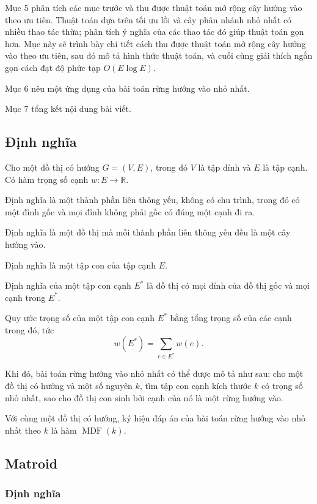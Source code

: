 \documentclass[11pt]{article}
\begin{document}
Mục 5 phân tích các mục trước và thu được thuật toán mở rộng cây hướng vào theo
ưu tiên. Thuật toán dựa trên tối ưu lồi và cây phân nhánh nhỏ nhất có nhiều thao
tác thừa; phân tích ý nghĩa của các thao tác đó giúp thuật toán gọn hơn. Mục
này sẽ trình bày chi tiết cách thu được thuật toán mở rộng cây hướng vào theo
ưu tiên, sau đó mô tả hình thức thuật toán, và cuối cùng giải thích ngắn gọn
cách đạt độ phức tạp \(O(E\log E)\).

Mục 6 nêu một ứng dụng của bài toán rừng hướng vào nhỏ nhất.

Mục 7 tổng kết nội dung bài viết.

\subsection{Định nghĩa}

Cho một đồ thị có hướng \(G=(V,E)\), trong đó \(V\) là tập đỉnh và \(E\) là tập
cạnh. Có hàm trọng số cạnh \(w:E\to\mathbb{R}\).

Định nghĩa  là một thành phần liên thông yếu, không có chu
trình, trong đó có một đỉnh gốc và mọi đỉnh không phải gốc có đúng một cạnh đi
ra.

Định nghĩa  là một đồ thị mà mỗi thành phần liên thông yếu
đều là một cây hướng vào.

Định nghĩa  là một tập con của tập cạnh \(E\).

Định nghĩa  của một tập con cạnh \(E^*\) là đồ
thị có mọi đỉnh của đồ thị gốc và mọi cạnh trong \(E^*\).

Quy ước trọng số của một tập con cạnh \(E^*\) bằng tổng trọng số của các cạnh
trong đó, tức
\[
w(E^*)=\sum_{e\in E^*}w(e).
\]

Khi đó, bài toán rừng hướng vào nhỏ nhất có thể được mô tả như sau: cho một đồ
thị có hướng và một số nguyên \(k\), tìm tập con cạnh kích thước \(k\) có trọng
số nhỏ nhất, sao cho đồ thị con sinh bởi cạnh của nó là một rừng hướng vào.

Với cùng một đồ thị có hướng, ký hiệu đáp án của bài toán rừng hướng vào nhỏ
nhất theo \(k\) là hàm \(\operatorname{MDF}(k)\).

\subsection{Matroid}

\subsubsection{Định nghĩa}
\end{document}
